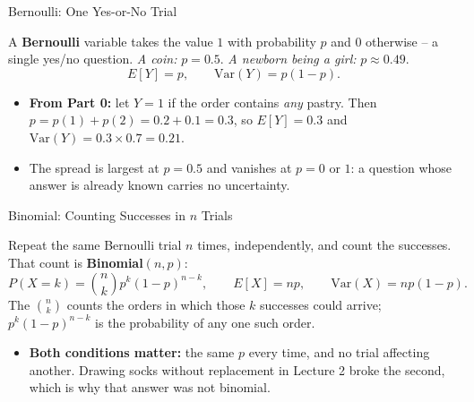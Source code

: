 \begin{frame}{Bernoulli: One Yes-or-No Trial}
\begin{rldefinition}
A \textbf{Bernoulli} variable takes the value $1$ with probability $p$ and $0$ otherwise -- a single yes/no question. \emph{A coin:} $p = 0.5$. \emph{A newborn being a girl:} $p \approx 0.49$.
\[
E[Y] = p, \qquad \mathrm{Var}(Y) = p(1-p).
\]
\end{rldefinition}
\pause
\begin{itemize}
  \item \textbf{From Part 0:} let $Y = 1$ if the order contains \emph{any} pastry. Then $p = p(1) + p(2) = 0.2 + 0.1 = 0.3$, so $E[Y] = 0.3$ and $\mathrm{Var}(Y) = 0.3 \times 0.7 = 0.21$.
  \pause
  \item The spread is largest at $p = 0.5$ and vanishes at $p = 0$ or $1$: a question whose answer is already known carries no uncertainty.
\end{itemize}
\end{frame}

\begin{frame}{Binomial: Counting Successes in $n$ Trials}
\begin{rldefinition}
Repeat the same Bernoulli trial $n$ times, independently, and count the successes. That count is \textbf{Binomial}$(n, p)$:
\[
P(X = k) = \binom{n}{k} p^k (1-p)^{n-k},
\qquad E[X] = np, \qquad \mathrm{Var}(X) = np(1-p).
\]
The $\binom{n}{k}$ counts the orders in which those $k$ successes could arrive; $p^k(1-p)^{n-k}$ is the probability of any one such order.
\end{rldefinition}
\pause
\begin{itemize}
  \item \textbf{Both conditions matter:} the same $p$ every time, and no trial affecting another. Drawing socks without replacement in Lecture 2 broke the second, which is why that answer was not binomial.
\end{itemize}
\end{frame}


